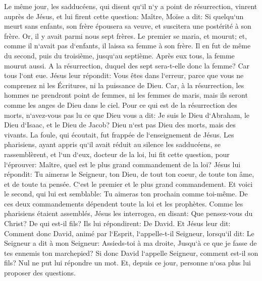 \verse Le même jour, les sadducéens, qui disent qu`il n`y a point de résurrection, vinrent auprès de Jésus, et lui firent cette question: 
\verse Maître, Moïse a dit: Si quelqu`un meurt sans enfants, son frère épousera sa veuve, et suscitera une postérité à son frère. 
\verse Or, il y avait parmi nous sept frères. Le premier se maria, et mourut; et, comme il n`avait pas d`enfants, il laissa sa femme à son frère. 
\verse Il en fut de même du second, puis du troisième, jusqu`au septième. 
\verse Après eux tous, la femme mourut aussi. 
\verse A la résurrection, duquel des sept sera-t-elle donc la femme? Car tous l`ont eue. 
\verse Jésus leur répondit: Vous êtes dans l`erreur, parce que vous ne comprenez ni les Écritures, ni la puissance de Dieu. 
\verse Car, à la résurrection, les hommes ne prendront point de femmes, ni les femmes de maris, mais ils seront comme les anges de Dieu dans le ciel. 
\verse Pour ce qui est de la résurrection des morts, n`avez-vous pas lu ce que Dieu vous a dit: 
\verse Je suis le Dieu d`Abraham, le Dieu d`Isaac, et le Dieu de Jacob? Dieu n`est pas Dieu des morts, mais des vivants. 
\verse La foule, qui écoutait, fut frappée de l`enseignement de Jésus. 
\verse Les pharisiens, ayant appris qu`il avait réduit au silence les sadducéens, se rassemblèrent, 
\verse et l`un d`eux, docteur de la loi, lui fit cette question, pour l`éprouver: 
\verse Maître, quel est le plus grand commandement de la loi? 
\verse Jésus lui répondit: Tu aimeras le Seigneur, ton Dieu, de tout ton coeur, de toute ton âme, et de toute ta pensée. 
\verse C`est le premier et le plus grand commandement. 
\verse Et voici le second, qui lui est semblable: Tu aimeras ton prochain comme toi-même. 
\verse De ces deux commandements dépendent toute la loi et les prophètes. 
\verse Comme les pharisiens étaient assemblés, Jésus les interrogea, 
\verse en disant: Que pensez-vous du Christ? De qui est-il fils? Ils lui répondirent: De David. 
\verse Et Jésus leur dit: Comment donc David, animé par l`Esprit, l`appelle-t-il Seigneur, lorsqu`il dit: 
\verse Le Seigneur a dit à mon Seigneur: Assieds-toi à ma droite, Jusqu`à ce que je fasse de tes ennemis ton marchepied? 
\verse Si donc David l`appelle Seigneur, comment est-il son fils? 
\verse Nul ne put lui répondre un mot. Et, depuis ce jour, personne n`osa plus lui proposer des questions. 


